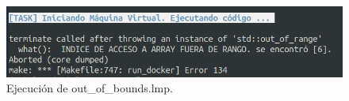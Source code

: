 \newpage
\begin{figure}[h]
    \includegraphics[width=\linewidth]{images/ejemplos/exceptions/out_of_bounds.png}
    \caption{Ejecución de out\_of\_bounds.lmp.}
    \label{fig:lamportExceptionOutOfBounds_exec}
\end{figure}